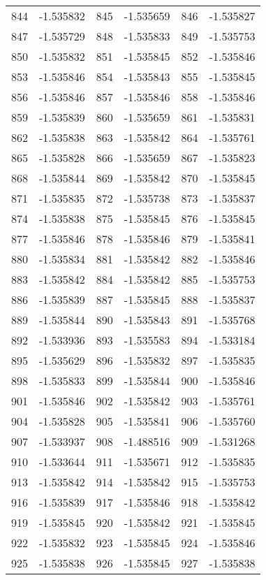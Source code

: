 \documentclass[12pt]{article}
\begin{document}
\begin{longtable}{@{}cc|cc|cc@{}}
844 & -1.535832 & 845 & -1.535659 & 846 & -1.535827 \\
847 & -1.535729 & 848 & -1.535833 & 849 & -1.535753 \\
850 & -1.535832 & 851 & -1.535845 & 852 & -1.535846 \\
853 & -1.535846 & 854 & -1.535843 & 855 & -1.535845 \\
856 & -1.535846 & 857 & -1.535846 & 858 & -1.535846 \\
859 & -1.535839 & 860 & -1.535659 & 861 & -1.535831 \\
862 & -1.535838 & 863 & -1.535842 & 864 & -1.535761 \\
865 & -1.535828 & 866 & -1.535659 & 867 & -1.535823 \\
868 & -1.535844 & 869 & -1.535842 & 870 & -1.535845 \\
871 & -1.535835 & 872 & -1.535738 & 873 & -1.535837 \\
874 & -1.535838 & 875 & -1.535845 & 876 & -1.535845 \\
877 & -1.535846 & 878 & -1.535846 & 879 & -1.535841 \\
880 & -1.535834 & 881 & -1.535842 & 882 & -1.535846 \\
883 & -1.535842 & 884 & -1.535842 & 885 & -1.535753 \\
886 & -1.535839 & 887 & -1.535845 & 888 & -1.535837 \\
889 & -1.535844 & 890 & -1.535843 & 891 & -1.535768 \\
892 & -1.533936 & 893 & -1.535583 & 894 & -1.533184 \\
895 & -1.535629 & 896 & -1.535832 & 897 & -1.535835 \\
898 & -1.535833 & 899 & -1.535844 & 900 & -1.535846 \\
901 & -1.535846 & 902 & -1.535842 & 903 & -1.535761 \\
904 & -1.535828 & 905 & -1.535841 & 906 & -1.535760 \\
907 & -1.533937 & 908 & -1.488516 & 909 & -1.531268 \\
910 & -1.533644 & 911 & -1.535671 & 912 & -1.535835 \\
913 & -1.535842 & 914 & -1.535842 & 915 & -1.535753 \\
916 & -1.535839 & 917 & -1.535846 & 918 & -1.535842 \\
919 & -1.535845 & 920 & -1.535842 & 921 & -1.535845 \\
922 & -1.535832 & 923 & -1.535845 & 924 & -1.535846 \\
925 & -1.535838 & 926 & -1.535845 & 927 & -1.535838 \\

\end{longtable}
\end{document}
